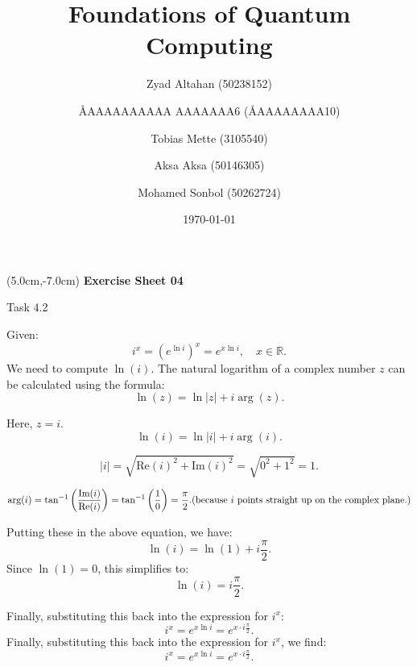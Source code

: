 \documentclass[aspectratio=169]{beamer}
\title{Foundations of Quantum Computing}
\author[]{Zyad Altahan (50238152) \and \AA{AAAAAAAAAA AAAAAAA}{6} (\AA{AAAAAAAA}{10}) \and Tobias Mette (3105540) \and Aksa Aksa (50146305) \and Mohamed Sonbol (50262724)}
\institute[]{Department of Computer Science \\ University of Bonn}
\date{\today}
\begin{document}
\begin{frame}
    \titlepage
    \begin{textblock*}{8cm}(5.0cm,-7.0cm)
        {\large \color{uwopurple}\hspace{0.66cm} \textbf{Exercise Sheet 04}} %
    \end{textblock*}
\end{frame}


\begin{frame}[fragile]{Task 4.2}

{\footnotesize
Given:
\[
i^x = (e^{\ln i})^x = e^{x \ln i}, \quad x \in \mathbb{R}.
\]
We need to compute \( \ln(i) \). The natural logarithm of a complex number \( z \) can be calculated using the formula:
\[
\ln(z) = \ln|z| + i\arg(z).
\]

Here, \( z = i \).
\[
\ln(i) = \ln|i| + i\arg(i).
\]

\[
|i| = \sqrt{\text{Re}(i)^2 + \text{Im}(i)^2} = \sqrt{0^2 + 1^2} = 1.
\]

\[
\arg(i) = \tan^{-1}\left(\frac{\text{Im}(i)}{\text{Re}(i)}\right) = \tan^{-1}\left(\frac{1}{0}\right) = \frac{\pi}{2}.
\hfill \text{(because \( i \) points straight up on the complex plane.)}
\]

Putting these in the above equation, we have:
\[
\ln(i) = \ln(1) + i\frac{\pi}{2}.
\]
Since \( \ln(1) = 0 \), this simplifies to:
\[
\ln(i) = i\frac{\pi}{2}.
\]

Finally, substituting this back into the expression for \( i^x \):
\[
i^x = e^{x \ln i} = e^{x \cdot i\frac{\pi}{2}}.
\]
Finally, substituting this back into the expression for \( i^x \), we find:
\[
i^x = e^{x \ln i} = e^{x \cdot i\frac{\pi}{2}}.
\]
}
\end{frame}
\end{document}
